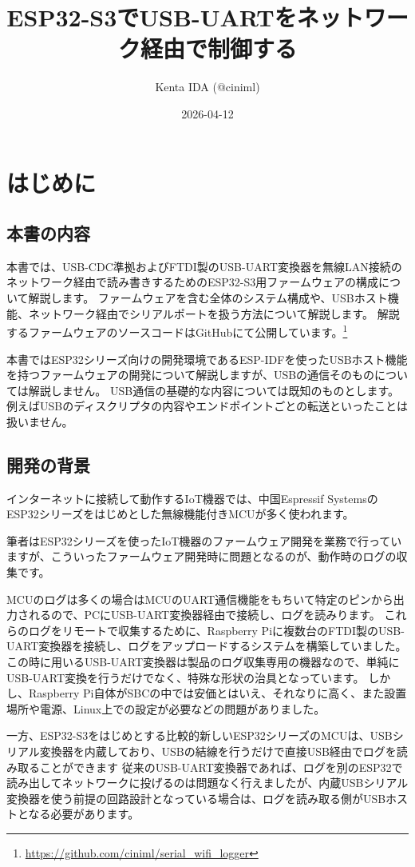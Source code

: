 \documentclass[10pt,twoside,openany,a4j]{ltjsbook}
\title{ESP32-S3でUSB-UARTをネットワーク経由で制御する}
\author{Kenta IDA (@ciniml)}
\date{2026-04-12}
\begin{document}
{
\setcounter{tocdepth}{2}
\tableofcontents
}
\chapter{はじめに}\label{ux306fux3058ux3081ux306b}

\section{本書の内容}\label{ux672cux66f8ux306eux5185ux5bb9}

本書では、USB-CDC準拠およびFTDI製のUSB-UART変換器を無線LAN接続のネットワーク経由で読み書きするためのESP32-S3用ファームウェアの構成について解説します。
ファームウェアを含む全体のシステム構成や、USBホスト機能、ネットワーク経由でシリアルポートを扱う方法について解説します。
解説するファームウェアのソースコードはGitHubにて公開しています。\footnote{\url{https://github.com/ciniml/serial_wifi_logger}}

本書ではESP32シリーズ向けの開発環境であるESP-IDFを使ったUSBホスト機能を持つファームウェアの開発について解説しますが、USBの通信そのものについては解説しません。
USB通信の基礎的な内容については既知のものとします。例えばUSBのディスクリプタの内容やエンドポイントごとの転送といったことは扱いません。

\section{開発の背景}\label{ux958bux767aux306eux80ccux666f}

インターネットに接続して動作するIoT機器では、中国Espressif
SystemsのESP32シリーズをはじめとした無線機能付きMCUが多く使われます。

筆者はESP32シリーズを使ったIoT機器のファームウェア開発を業務で行っていますが、こういったファームウェア開発時に問題となるのが、動作時のログの収集です。

MCUのログは多くの場合はMCUのUART通信機能をもちいて特定のピンから出力されるので、PCにUSB-UART変換器経由で接続し、ログを読みります。
これらのログをリモートで収集するために、Raspberry
Piに複数台のFTDI製のUSB-UART変換器を接続し、ログをアップロードするシステムを構築していました。
この時に用いるUSB-UART変換器は製品のログ収集専用の機器なので、単純にUSB-UART変換を行うだけでなく、特殊な形状の治具となっています。
しかし、Raspberry
Pi自体がSBCの中では安価とはいえ、それなりに高く、また設置場所や電源、Linux上での設定が必要などの問題がありました。

一方、ESP32-S3をはじめとする比較的新しいESP32シリーズのMCUは、USBシリアル変換器を内蔵しており、USBの結線を行うだけで直接USB経由でログを読み取ることができます
従来のUSB-UART変換器であれば、ログを別のESP32で読み出してネットワークに投げるのは問題なく行えましたが、内蔵USBシリアル変換器を使う前提の回路設計となっている場合は、ログを読み取る側がUSBホストとなる必要があります。
\end{document}
